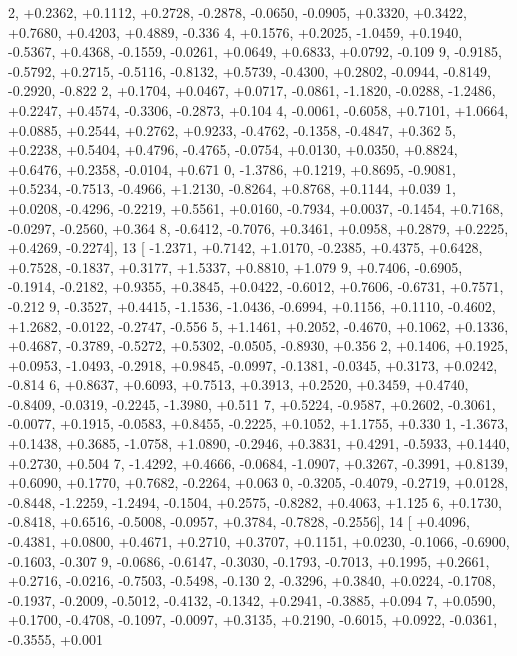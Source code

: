 \begin{DoxyCode}
      2, +0.2362, +0.1112, +0.2728, -0.2878, -0.0650, -0.0905, +0.3320, +0.3422, +0.7680, +0.4203, +0.4889, -0.336
      4, +0.1576, +0.2025, -1.0459, +0.1940, -0.5367, +0.4368, -0.1559, -0.0261, +0.0649, +0.6833, +0.0792, -0.109
      9, -0.9185, -0.5792, +0.2715, -0.5116, -0.8132, +0.5739, -0.4300, +0.2802, -0.0944, -0.8149, -0.2920, -0.822
      2, +0.1704, +0.0467, +0.0717, -0.0861, -1.1820, -0.0288, -1.2486, +0.2247, +0.4574, -0.3306, -0.2873, +0.104
      4, -0.0061, -0.6058, +0.7101, +1.0664, +0.0885, +0.2544, +0.2762, +0.9233, -0.4762, -0.1358, -0.4847, +0.362
      5, +0.2238, +0.5404, +0.4796, -0.4765, -0.0754, +0.0130, +0.0350, +0.8824, +0.6476, +0.2358, -0.0104, +0.671
      0, -1.3786, +0.1219, +0.8695, -0.9081, +0.5234, -0.7513, -0.4966, +1.2130, -0.8264, +0.8768, +0.1144, +0.039
      1, +0.0208, -0.4296, -0.2219, +0.5561, +0.0160, -0.7934, +0.0037, -0.1454, +0.7168, -0.0297, -0.2560, +0.364
      8, -0.6412, -0.7076, +0.3461, +0.0958, +0.2879, +0.2225, +0.4269, -0.2274],
13 [ -1.2371, +0.7142, +1.0170, -0.2385, +0.4375, +0.6428, +0.7528, -0.1837, +0.3177, +1.5337, +0.8810, +1.079
      9, +0.7406, -0.6905, -0.1914, -0.2182, +0.9355, +0.3845, +0.0422, -0.6012, +0.7606, -0.6731, +0.7571, -0.212
      9, -0.3527, +0.4415, -1.1536, -1.0436, -0.6994, +0.1156, +0.1110, -0.4602, +1.2682, -0.0122, -0.2747, -0.556
      5, +1.1461, +0.2052, -0.4670, +0.1062, +0.1336, +0.4687, -0.3789, -0.5272, +0.5302, -0.0505, -0.8930, +0.356
      2, +0.1406, +0.1925, +0.0953, -1.0493, -0.2918, +0.9845, -0.0997, -0.1381, -0.0345, +0.3173, +0.0242, -0.814
      6, +0.8637, +0.6093, +0.7513, +0.3913, +0.2520, +0.3459, +0.4740, -0.8409, -0.0319, -0.2245, -1.3980, +0.511
      7, +0.5224, -0.9587, +0.2602, -0.3061, -0.0077, +0.1915, -0.0583, +0.8455, -0.2225, +0.1052, +1.1755, +0.330
      1, -1.3673, +0.1438, +0.3685, -1.0758, +1.0890, -0.2946, +0.3831, +0.4291, -0.5933, +0.1440, +0.2730, +0.504
      7, -1.4292, +0.4666, -0.0684, -1.0907, +0.3267, -0.3991, +0.8139, +0.6090, +0.1770, +0.7682, -0.2264, +0.063
      0, -0.3205, -0.4079, -0.2719, +0.0128, -0.8448, -1.2259, -1.2494, -0.1504, +0.2575, -0.8282, +0.4063, +1.125
      6, +0.1730, -0.8418, +0.6516, -0.5008, -0.0957, +0.3784, -0.7828, -0.2556],
14 [ +0.4096, -0.4381, +0.0800, +0.4671, +0.2710, +0.3707, +0.1151, +0.0230, -0.1066, -0.6900, -0.1603, -0.307
      9, -0.0686, -0.6147, -0.3030, -0.1793, -0.7013, +0.1995, +0.2661, +0.2716, -0.0216, -0.7503, -0.5498, -0.130
      2, -0.3296, +0.3840, +0.0224, -0.1708, -0.1937, -0.2009, -0.5012, -0.4132, -0.1342, +0.2941, -0.3885, +0.094
      7, +0.0590, +0.1700, -0.4708, -0.1097, -0.0097, +0.3135, +0.2190, -0.6015, +0.0922, -0.0361, -0.3555, +0.001

\end{DoxyCode}
